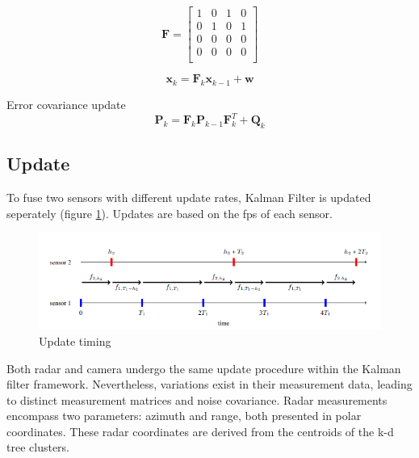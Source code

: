 \begin{equation}\label{equ:transition_matrix_H}
    \mathbf{F} = 
    \begin{bmatrix}
        1 & 0 & 1 & 0 \\
        0 & 1 & 0 & 1 \\
        0 & 0 & 0 & 0 \\
        0 & 0 & 0 & 0 \\
      \end{bmatrix}
\end{equation}

\begin{equation}\label{equ:predict_eq}
    \mathbf{x}_k=\mathbf{F}_k\mathbf{x}_{k-1}+\mathbf{w}
\end{equation}

Error covariance update
\begin{equation}\label{equ:error_covariance}
    \mathbf{P}_k=\mathbf{F}_k \mathbf{P}_{k-1} \mathbf{F}_k^T+\mathbf{Q}_k
\end{equation}

\newpage
\subsection{Update}\label{equ:2_update}
To fuse two sensors with different update rates, Kalman Filter is updated seperately (figure \ref{fig:sync_fig}).
Updates are based on the fps of each sensor.
\begin{figure}[hpbt]
    \centering
    \includegraphics[width=\textwidth]{Figures/sync.png}%
    \caption{Update timing \cite{7472511}}
    \label{fig:sync_fig}
\end{figure}


Both radar and camera undergo the same update procedure within the Kalman filter framework. 
Nevertheless, variations exist in their measurement data, 
leading to distinct measurement matrices and noise covariance. 
Radar measurements encompass two parameters: azimuth and range, 
both presented in polar coordinates. 
These radar coordinates are derived from the centroids of the k-d tree clusters.


